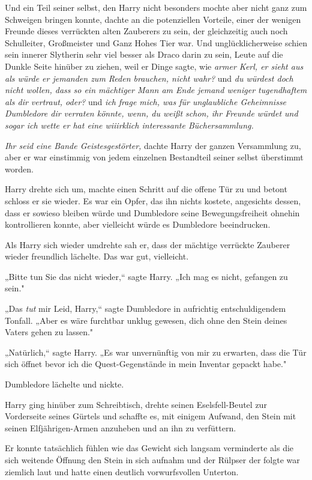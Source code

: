 {Und ein Teil seiner selbst, den Harry nicht besonders mochte aber nicht ganz zum Schweigen bringen konnte, dachte an die potenziellen Vorteile, einer der wenigen Freunde dieses verrückten alten Zauberers zu sein, der gleichzeitig auch noch Schulleiter, Großmeister und Ganz Hohes Tier war. Und unglücklicherweise schien sein innerer Slytherin sehr viel besser als Draco darin zu sein, Leute auf die Dunkle Seite hinüber zu ziehen, weil er Dinge sagte, wie \emph{armer Kerl, er sieht aus als würde er jemanden zum Reden brauchen, nicht wahr?} und \emph{du würdest doch nicht wollen, dass so ein mächtiger Mann am Ende jemand weniger tugendhaftem als dir vertraut, oder?} und \emph{ich frage mich, was für unglaubliche Geheimnisse Dumbledore dir verraten könnte, wenn, du weißt schon, ihr Freunde würdet und sogar ich wette er hat eine wiiirklich interessante Büchersammlung.}

\emph{Ihr seid eine Bande Geistesgestörter,} dachte Harry der ganzen Versammlung zu, aber er war einstimmig von jedem einzelnen Bestandteil seiner selbst überstimmt worden.

Harry drehte sich um, machte einen Schritt auf die offene Tür zu und betont schloss er sie wieder. Es war ein Opfer, das ihn nichts kostete, angesichts dessen, dass er sowieso bleiben würde und Dumbledore seine Bewegungsfreiheit ohnehin kontrollieren konnte, aber vielleicht würde es Dumbledore beeindrucken.

Als Harry sich wieder umdrehte sah er, dass der mächtige verrückte Zauberer wieder freundlich lächelte. Das war gut, vielleicht.

„Bitte tun Sie das nicht wieder,“ sagte Harry. „Ich mag es nicht, gefangen zu sein."

„Das \emph{tut} mir Leid, Harry,“ sagte Dumbledore in aufrichtig entschuldigendem Tonfall. „Aber es wäre furchtbar unklug gewesen, dich ohne den Stein deines Vaters gehen zu lassen."

„Natürlich,“ sagte Harry. „Es war unvernünftig von mir zu erwarten, dass die Tür sich öffnet bevor ich die Quest-Gegenstände in mein Inventar gepackt habe."

Dumbledore lächelte und nickte.

Harry ging hinüber zum Schreibtisch, drehte seinen Eselsfell-Beutel zur Vorderseite seines Gürtels und schaffte es, mit einigem Aufwand, den Stein mit seinen Elfjährigen-Armen anzuheben und an ihn zu verfüttern.

Er konnte tatsächlich fühlen wie das Gewicht sich langsam verminderte als die sich weitende Öffnung den Stein in sich aufnahm und der Rülpser der folgte war ziemlich laut und hatte einen deutlich vorwurfsvollen Unterton.

}
